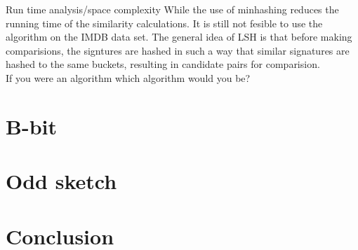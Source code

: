 \documentclass[a4paper,11pt]{article}
\begin{document}
Run time analysis/space complexity
While the use of minhashing reduces the running time of the similarity calculations. It is still not fesible to use the algorithm on the IMDB data set. The general idea of LSH is that before making comparisions, the signtures are hashed in such a way that similar signatures are hashed to the same buckets, resulting in candidate pairs for comparision.\\

If you were an algorithm which algorithm would you be?

\section{B-bit}

\section{Odd sketch}

\section{Conclusion}
\end{document}

